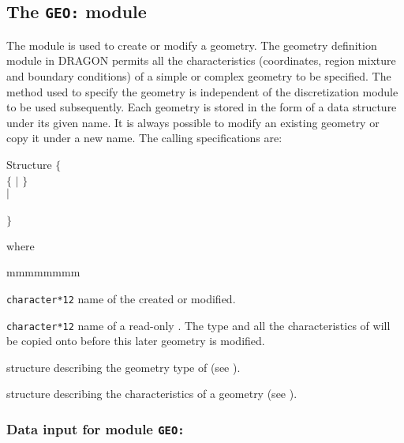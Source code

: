 \subsection{The {\tt GEO:} module}\label{sect:GEOData}

The  module is used to create or modify a geometry. The geometry
definition module in DRAGON permits all the characteristics (coordinates,
region mixture and boundary conditions) of a simple or complex
geometry to be specified. The method used to specify the geometry is independent
of the discretization module to be used subsequently. Each geometry is stored in
the form of a  data structure under its given name. It is
always possible to modify an existing geometry or copy it under a new name. 
The calling specifications are:

\begin{DataStructure}{Structure }
$\{$ \\
\hskip 0.3cm  \moc{:=}  $\{$  $|$  $\}$
\moc{::}   \\
 $|$ \\
\hskip 0.3cm   \moc{:=}  \moc{::}    \\
 $\}$ 
\end{DataStructure}

\noindent

\noindent where
\begin{ListeDeDescription}{mmmmmmmm}

\item[\dusa{GEONAM}] {\tt character*12} name of the  created or
modified.

\item[\dusa{OLDGEO}] {\tt character*12} name of a read-only .
The type and all the characteristics of  will be copied onto 
before this later geometry is modified.

\item[\dstr{descgtyp}] structure describing the geometry type of
 (see ).

\item[\dstr{descgcnt}] structure describing the characteristics of a geometry
(see ).

\end{ListeDeDescription}

\subsubsection{Data input for module {\tt GEO:}}\label{sect:descgeo}

